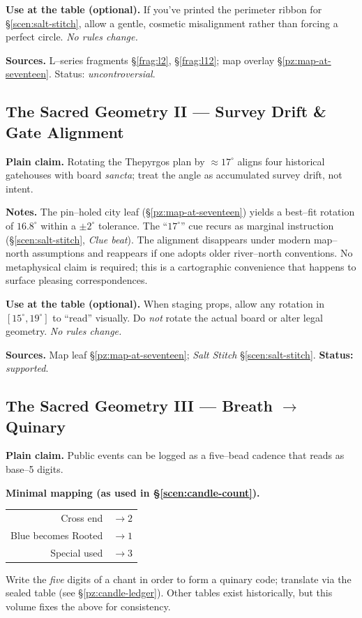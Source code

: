 \documentclass[11pt]{article}
\begin{document}
\begin{itemize}
\medskip
\noindent\textbf{Use at the table (optional).} If you’ve printed the perimeter ribbon for \S\ref{scen:salt-stitch}, allow a gentle, cosmetic misalignment rather than forcing a perfect circle. \emph{No rules change.}

\medskip
\noindent\textbf{Sources.} L–series fragments \S\ref{frag:l2}, \S\ref{frag:l12}; map overlay \S\ref{pz:map-at-seventeen}. Status: \emph{uncontroversial}.

\subsection{The Sacred Geometry II — Survey Drift \& Gate Alignment}
\label{geometry:survey-drift}

\noindent\textbf{Plain claim.} Rotating the Thepyrgos plan by \(\approx 17^\circ\) aligns four historical gatehouses with board \emph{sancta}; treat the angle as accumulated survey drift, not intent.

\medskip
\noindent\textbf{Notes.} The pin–holed city leaf (\S\ref{pz:map-at-seventeen}) yields a best–fit rotation of \(16.8^\circ\) within a \(\pm 2^\circ\) tolerance. The “\(17^\circ\)” cue recurs as marginal instruction (\S\ref{scen:salt-stitch}, \emph{Clue beat}). The alignment disappears under modern map–north assumptions and reappears if one adopts older river–north conventions. No metaphysical claim is required; this is a cartographic convenience that happens to surface pleasing correspondences.

\medskip
\noindent\textbf{Use at the table (optional).} When staging props, allow any rotation in \([15^\circ,19^\circ]\) to “read” visually. Do \emph{not} rotate the actual board or alter legal geometry. \emph{No rules change.}

\medskip
\noindent\textbf{Sources.} Map leaf \S\ref{pz:map-at-seventeen}; \textit{Salt Stitch} \S\ref{scen:salt-stitch}. \textbf{Status:} \emph{supported}.

\subsection{The Sacred Geometry III — Breath $\rightarrow$ Quinary}
\label{geometry:breath-quinary}

\noindent\textbf{Plain claim.} Public events can be logged as a five–bead cadence that reads as base–5 digits.

\medskip
\noindent\textbf{Minimal mapping (as used in \S\ref{scen:candle-count}).}
\begin{center}
\begin{tabular}{rl}
Cross end & \(\rightarrow 2\) \\
Blue becomes Rooted & \(\rightarrow 1\) \\
Special used & \(\rightarrow 3\)
\end{tabular}
\end{center}
Write the \emph{five} digits of a chant in order to form a quinary code; translate via the sealed table (see \S\ref{pz:candle-ledger}). Other tables exist historically, but this volume fixes the above for consistency.


\end{itemize}
\end{document}
